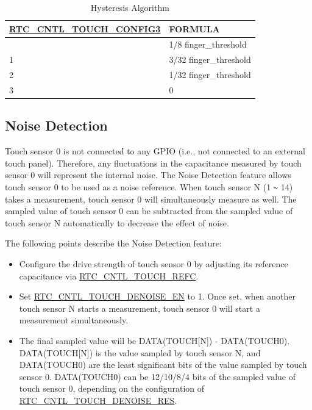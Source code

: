 \documentclass[main\_\_EN.tex]{subfiles}
\begin{document}
\begin{longtable}[c]{|p{6 cm}|p{4cm}|}
    \caption{Hysteresis Algorithm}
    \label{table:hysteresis_cal}\\
    \hline
    \rowcolor{lightgray}
    \textbf{\hyperref[fielddesc:RTCCNTLTOUCHHYSTERESIS]{RTC\_CNTL\_TOUCH\_CONFIG3}} & \textbf{FORMULA}\\
    \hline
    \endhead
    \endfoot
    \endlastfoot
    0  & 1/8 finger\_threshold \\\hline
    1  & 3/32 finger\_threshold \\\hline
    2  & 1/32 finger\_threshold \\\hline
    3  & 0 \\\hline
\end{longtable}

\subsection{Noise Detection}
\label{subsubsec:noise-detection}

Touch sensor 0 is not connected to any GPIO (i.e., not connected to an external touch panel). Therefore, any fluctuations in the capacitance measured by touch sensor 0 will represent the internal noise. The Noise Detection feature allows touch sensor 0 to be used as a noise reference. When touch sensor N (1 \verb+~+ 14) takes a measurement, touch sensor 0 will simultaneously measure as well. The sampled value of touch sensor 0 can be subtracted from the sampled value of touch sensor N automatically to decrease the effect of noise.

The following points describe the Noise Detection feature:
\begin{itemize}
    \item Configure the drive strength of touch sensor 0 by adjusting its reference capacitance via \hyperref[fielddesc:RTCCNTLTOUCHREFC]{RTC\_CNTL\_TOUCH\_REFC}.
    \item Set \hyperref[fielddesc:RTCCNTLTOUCHDENOISEEN]{RTC\_CNTL\_TOUCH\_DENOISE\_EN} to 1. Once set, when another touch sensor N starts a measurement, touch sensor 0 will start a measurement simultaneously.
    \item The final sampled value will be DATA(TOUCH[N]) - DATA(TOUCH0). DATA(TOUCH[N]) is the value sampled by touch sensor N, and DATA(TOUCH0) are the least significant bits of the value sampled by touch sensor 0. DATA(TOUCH0) can be 12/10/8/4 bits of the sampled value of touch sensor 0, depending on the configuration of \hyperref[fielddesc:RTCCNTLTOUCHDENOISERES]{RTC\_CNTL\_TOUCH\_DENOISE\_RES}.
\end{itemize}
\end{document}
